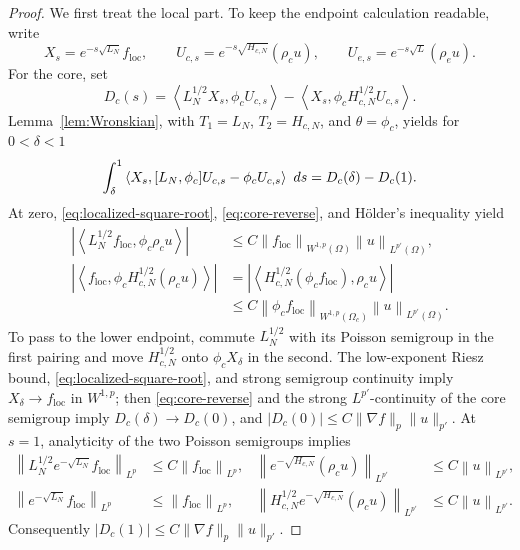 \documentclass[10pt,a4paper]{amsart}
\newcommand{\abs}[1]{\left\lvert #1\right\rvert}
\newcommand\dd{\,{\rm d}}
\newcommand{\ip}[2]{\left\langle #1,#2\right\rangle}
\newcommand{\norm}[2]{\left\lVert #1\right\rVert_{#2}}
\begin{document}
\begin{proof}
We first treat the local part.  To keep the endpoint calculation readable,
write
\[
 X_s=e^{-s\sqrt{L_N}}f_{\mathrm{loc}},\qquad
 U_{c,s}=e^{-s\sqrt{H_{c,N}}}(\rho_cu),\qquad
 U_{e,s}=e^{-s\sqrt L}(\rho_eu).
\]
For the core, set
\[
 D_c(s)=\ip{L_N^{1/2}X_s}{\phi_cU_{c,s}}
       -\ip{X_s}{\phi_cH_{c,N}^{1/2}U_{c,s}}.
\]
Lemma~\ref{lem:Wronskian}, with
$T_1=L_N$, $T_2=H_{c,N}$, and $\theta=\phi_c$, yields for
$0<\delta<1$
\begin{equation}\label{eq:core-Wronskian-truncated}
 \int_\delta^1\ip{X_s}
 {[L_N,\phi_c]U_{c,s}-\phi_cU_{c,s}}\,\dd s
 =D_c(\delta)-D_c(1).
\end{equation}
At zero, \eqref{eq:localized-square-root}, \eqref{eq:core-reverse}, and
H\"older's inequality yield
\begin{align*}
 \abs{\ip{L_N^{1/2}f_{\mathrm{loc}}}{\phi_c\rho_cu}}
 &\leq C\norm{f_{\mathrm{loc}}}{W^{1,p}(\Omega)}
          \norm u{L^{p'}(\Omega)},\\
 \abs{\ip{f_{\mathrm{loc}}}
 {\phi_cH_{c,N}^{1/2}(\rho_cu)}}
 &=\abs{\ip{H_{c,N}^{1/2}(\phi_cf_{\mathrm{loc}})}{\rho_cu}}\\
 &\leq C\norm{\phi_cf_{\mathrm{loc}}}{W^{1,p}(\Omega_c)}
          \norm u{L^{p'}(\Omega)}.
\end{align*}
To pass to the lower endpoint, commute $L_N^{1/2}$ with its Poisson
semigroup in the first pairing and move $H_{c,N}^{1/2}$ onto
$\phi_cX_\delta$ in the second.  The low-exponent Riesz bound,
\eqref{eq:localized-square-root}, and strong semigroup continuity imply
$X_\delta\to f_{\mathrm{loc}}$ in $W^{1,p}$; then
\eqref{eq:core-reverse} and the strong $L^{p'}$-continuity of the core
semigroup imply $D_c(\delta)\to D_c(0)$, and
$|D_c(0)|\leq C\|\nabla f\|_p\|u\|_{p'}$.  At $s=1$, analyticity of the
two Poisson semigroups implies
\begin{align*}
 \norm{L_N^{1/2}e^{-\sqrt{L_N}}f_{\mathrm{loc}}}{L^p}
 &\leq C\norm{f_{\mathrm{loc}}}{L^p},&
 \norm{e^{-\sqrt{H_{c,N}}}(\rho_cu)}{L^{p'}}
 &\leq C\norm u{L^{p'}},\\
 \norm{e^{-\sqrt{L_N}}f_{\mathrm{loc}}}{L^p}
 &\leq\norm{f_{\mathrm{loc}}}{L^p},&
 \norm{H_{c,N}^{1/2}e^{-\sqrt{H_{c,N}}}(\rho_cu)}{L^{p'}}
 &\leq C\norm u{L^{p'}}.
\end{align*}
Consequently $|D_c(1)|\leq
C\|\nabla f\|_p\|u\|_{p'}$.


\end{proof}
\end{document}
